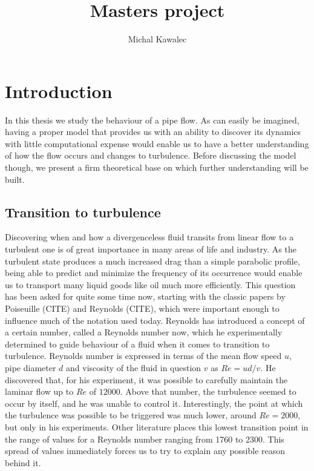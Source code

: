 \documentclass[11pt,a4paper]{article}
\begin{document}
\title{Masters project}
\author{Michal Kawalec}

\section{Introduction}

In this thesis we study the behaviour of a pipe flow.
As can easily be imagined, having a proper model that provides us with an ability to discover its dynamics with little computational expense would enable us to have a better understanding of how the flow occurs and changes to turbulence.
Before discussing the model though, we present a firm theoretical base on which further understanding will be built.

\subsection{Transition to turbulence}
Discovering when and how a divergenceless fluid transits from linear flow to a turbulent one is of great importance in many areas of life and industry.
As the turbulent state produces a much increased drag than a simple parabolic profile, being able to predict and minimize the frequency of its occurrence would enable us to transport many liquid goods like oil much more efficiently.
This question has been asked for quite some time now, starting with the classic papers by Poiseuille (CITE) and Reynolds (CITE), which were important enough to influence much of the notation used today.
Reynolds has introduced a concept of a certain number, called a Reynolds number now, which he experimentally determined to guide behaviour of a fluid when it comes to transition to turbulence.
Reynolds number is expressed in terms of the mean flow speed \(u\), pipe diameter \(d\) and viscosity of the fluid in question \(v\) as \(Re = ud/v\).
He discovered that, for his experiment, it was possible to carefully maintain the laminar flow up to \(Re\) of \(12000\).
Above that number, the turbulence seemed to occur by itself, and he was unable to control it.
Interestingly, the point at which the turbulence was possible to be triggered was much lower, around \(Re = 2000\), but only in his experiments.
Other literature places this lowest transition point in the range of values for a Reynolds number ranging from 1760 to 2300\cite{Kerswell05}.
This spread of values immediately forces us to try to explain any possible reason behind it.
\end{document}
